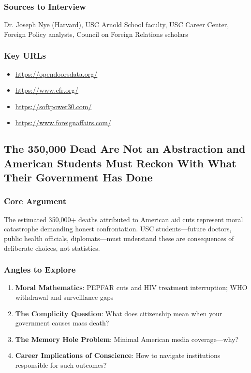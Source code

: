 \documentclass[11pt,letterpaper]{article}
\begin{document}
\subsubsection*{Sources to Interview}
Dr. Joseph Nye (Harvard), USC Arnold School faculty, USC Career Center, Foreign Policy analysts, Council on Foreign Relations scholars

\subsubsection*{Key URLs}
\begin{itemize}[noitemsep]
    \item \url{https://opendoorsdata.org/}
    \item \url{https://www.cfr.org/}
    \item \url{https://softpower30.com/}
    \item \url{https://www.foreignaffairs.com/}
\end{itemize}

\newpage
\subsection{The 350,000 Dead Are Not an Abstraction and American Students Must Reckon With What Their Government Has Done}

\subsubsection*{Core Argument}
The estimated 350,000+ deaths attributed to American aid cuts represent moral catastrophe demanding honest confrontation. USC students---future doctors, public health officials, diplomats---must understand these are consequences of deliberate choices, not statistics.

\subsubsection*{Angles to Explore}
\begin{enumerate}[noitemsep]
    \item \textbf{Moral Mathematics}: PEPFAR cuts and HIV treatment interruption; WHO withdrawal and surveillance gaps
    \item \textbf{The Complicity Question}: What does citizenship mean when your government causes mass death?
    \item \textbf{The Memory Hole Problem}: Minimal American media coverage---why?
    \item \textbf{Career Implications of Conscience}: How to navigate institutions responsible for such outcomes?
\end{enumerate}
\end{document}
